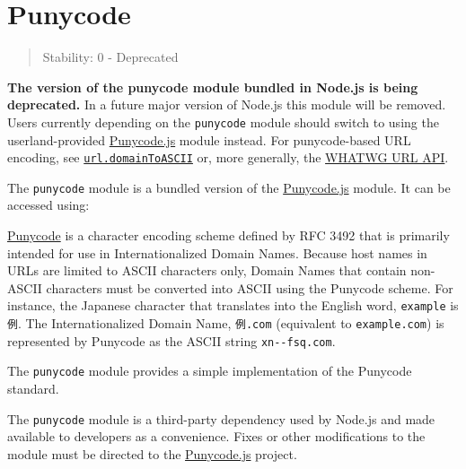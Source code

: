 \section{Punycode}\label{punycode}

\begin{quote}
Stability: 0 - Deprecated
\end{quote}

\textbf{The version of the punycode module bundled in Node.js is being
deprecated.} In a future major version of Node.js this module will be
removed. Users currently depending on the \texttt{punycode} module
should switch to using the userland-provided
\href{https://github.com/bestiejs/punycode.js}{Punycode.js} module
instead. For punycode-based URL encoding, see
\href{url.md\#urldomaintoasciidomain}{\texttt{url.domainToASCII}} or,
more generally, the \href{url.md\#the-whatwg-url-api}{WHATWG URL API}.

The \texttt{punycode} module is a bundled version of the
\href{https://github.com/bestiejs/punycode.js}{Punycode.js} module. It
can be accessed using:

\begin{Shaded}
\begin{Highlighting}[]
\OperatorTok{=} \NormalTok{(}\NormalTok{)}\OperatorTok{;}
\end{Highlighting}
\end{Shaded}

\href{https://tools.ietf.org/html/rfc3492}{Punycode} is a character
encoding scheme defined by RFC 3492 that is primarily intended for use
in Internationalized Domain Names. Because host names in URLs are
limited to ASCII characters only, Domain Names that contain non-ASCII
characters must be converted into ASCII using the Punycode scheme. For
instance, the Japanese character that translates into the English word,
\texttt{\textquotesingle{}example\textquotesingle{}} is
\texttt{\textquotesingle{}例\textquotesingle{}}. The Internationalized
Domain Name, \texttt{\textquotesingle{}例.com\textquotesingle{}}
(equivalent to \texttt{\textquotesingle{}example.com\textquotesingle{}})
is represented by Punycode as the ASCII string
\texttt{\textquotesingle{}xn-\/-fsq.com\textquotesingle{}}.

The \texttt{punycode} module provides a simple implementation of the
Punycode standard.

The \texttt{punycode} module is a third-party dependency used by Node.js
and made available to developers as a convenience. Fixes or other
modifications to the module must be directed to the
\href{https://github.com/bestiejs/punycode.js}{Punycode.js} project.

